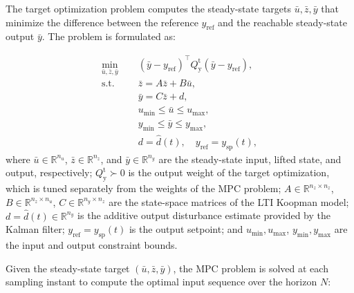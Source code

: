 \documentclass[preprint,12pt,authoryear]{elsarticle}
\theoremstyle{remark}
\newcommand{\ui}[2]{#1_{\text{#2}}}
\begin{document}
The target optimization problem computes the steady-state targets $\bar{u}, \bar{z}, \bar{y}$ that minimize the difference between the reference $y_\text{ref}$ and the reachable steady-state output $\bar{y}$. The problem is formulated as:

\begin{subequations}
  \label{eq:target:opt}
  \begin{align}
    \min_{\bar{u}, \bar{z}, \bar{y}} \quad & \; (\bar{y} - y_\text{ref})^\intercal \ui{Q}{y}^\text{t} (\bar{y} - y_\text{ref}) \label{eq:target:opt:obj}, \\
    \text{s.t.} \quad & \; \bar{z} = A\bar{z} + B\bar{u} \label{eq:target:opt:z}, \\
    & \; \bar{y} = C\bar{z} + d \label{eq:target:opt:y}, \\
    & \; u_{\min} \leq \bar{u} \leq u_{\max} \label{eq:target:opt:u}, \\
    & \; y_{\min} \leq \bar{y} \leq y_{\max} \label{eq:target:opt:ycon}, \\
    & \; d = \hat{d}(t), \quad y_\text{ref} = y_\text{sp}(t), \label{eq:target:opt:params}
  \end{align}
\end{subequations}
where $\bar{u} \in \mathbb{R}^{n_u}$, $\bar{z} \in \mathbb{R}^{n_z}$, and $\bar{y} \in \mathbb{R}^{n_y}$ are the steady-state input, lifted state, and output, respectively; $\ui{Q}{y}^\text{t} \succ 0$ is the output weight of the target optimization, which is tuned separately from the weights of the MPC problem; $A \in \mathbb{R}^{n_z \times n_z}$, $B \in \mathbb{R}^{n_z \times n_u}$, $C \in \mathbb{R}^{n_y \times n_z}$ are the state-space matrices of the LTI Koopman model; $d = \hat{d}(t) \in \mathbb{R}^{n_y}$ is the additive output disturbance estimate provided by the Kalman filter; $y_\text{ref} = y_\text{sp}(t)$ is the output setpoint; and $u_{\min}, u_{\max}$, $y_{\min}, y_{\max}$ are the input and output constraint bounds.

Given the steady-state target $(\bar{u}, \bar{z}, \bar{y})$, the MPC problem is solved at each sampling instant to compute the optimal input sequence over the horizon $N$:
\end{document}
